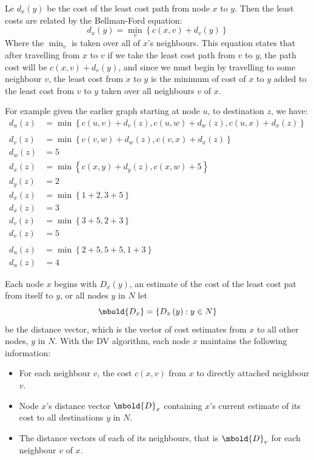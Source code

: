 \documentclass[12pt letter]{report}
\begin{document}
Le $d_x \left( y \right) $ be the cost of the least cost path from
node $x$ to $y$. Then the least costs are related by the Bellman-Ford equation:
\[
  d_x \left( y \right) = \min_v \left\{ c \left( x, v \right) + d_v
  \left( y \right)   \right\}
\]
Where the $\min_v$ is taken over all of $x$'s neighbours. This
equation states that after travelling from $x$ to $v$ if we take the
least cost path from $v$ to $y$, the path cost will be $c \left( x, v
\right)  + d_v \left( y \right) $, and since we must begin by
travelling to some neighbour $v$, the least cost from $x$ to $y$ is
the minimum of cost of $x$ to $y$ added to the least cost from $v$ to
$y$ taken over all neighbours $v$ of $x$.

For example given the earlier graph starting at node $u$, to
destination $z$, we have:
\begin{align*}
  d_u \left( z \right)  &=  \min \left\{ c \left( u, v \right) + d_v
    \left( z \right), c \left( u, w \right) + d_w \left( z \right), c
  \left( u, x \right) + d_x \left( z \right)   \right\}  \\
  \\
  d_v \left( z \right) &= \min \left\{ c \left( v, w \right) + d_w
  \left( z \right), c \left( v, x \right) + d_x \left( z \right)   \right\}   \\
  d_w \left( z \right) &=  5 \\
  d_x \left( z \right) &= \min \left\{ c \left( x, y \right) + d_y
  \left( z \right), c \left( x, w \right) + 5   \right\}   \\
  d_y \left( z \right)  &= 2 \\
  d_x \left( z \right) &= \min \left\{ 1 + 2, 3 + 5   \right\}   \\
  d_x \left( z \right) &= 3 \\
  d_v \left( z \right) &= \min \left\{ 3 + 5, 2 + 3   \right\}   \\
  d_v \left( z \right) &= 5 \\
  \\
  d_u \left( z \right)  &=  \min \left\{ 2 + 5, 5 + 5, 1 + 3   \right\}  \\
  d_u \left( z \right)  &= 4
\end{align*}

Each node $x$ begins with $D_x \left( y \right) $, an estimate of the
cost of the least cost pat from itself to $y$, or all nodes $y$ in $N$ let
\[
  \mbold{D_x} = \left\{ D_x \left( y \right) : y \in N \right\}
\]
be the distance vector, which is the vector of cost estimates from
$x$ to all other nodes, $y$ in $N$. With the DV algorithm, each node
$x$ maintains the following information:
\begin{itemize}
  \item For each neighbour $v$, the cost $c \left( x, v \right) $
    from $x$ to directly attached neighbour $v$.
  \item Node $x$'s distance vector $\mbold{D}_x$ containing $x$'s
    current estimate of its cost to all destinations $y$ in $N$.
  \item The distance vectors of each of its neighbours, that is
    $\mbold{D}_v$ for each neighbour $v$ of $x$.
\end{itemize}
\end{document}

